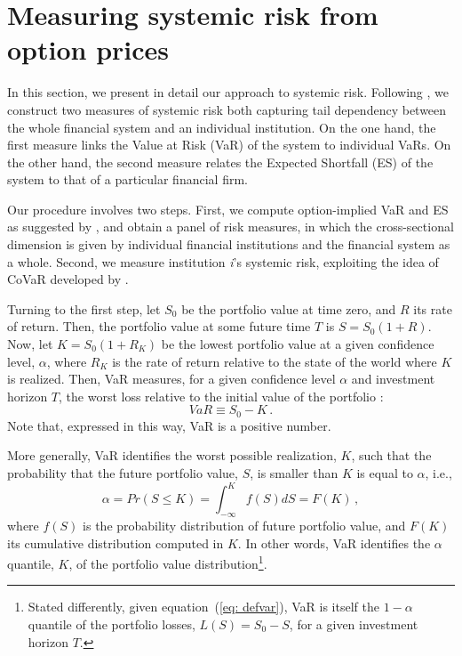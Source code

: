 \documentclass[11pt,a4paper,english]{article}
\begin{document}
\section{Measuring systemic risk from option prices}
\label{sec: model}
In this section, we present in detail our approach to systemic risk. Following \citet{Adrian2016}, we construct two measures of systemic risk both capturing tail dependency between the whole financial system and an individual institution. On the one hand, the first measure links the Value at Risk (VaR) of the system to individual VaRs. On the other hand, the second measure relates the Expected Shortfall (ES) of the system to that of a particular financial firm.

Our procedure involves two steps. First, we compute option-implied VaR and ES as suggested by \citet{GBA16}, and obtain a panel of risk measures, in which the cross-sectional dimension is given by individual financial institutions and the financial system as a whole. Second, we measure institution \textit{i}'s systemic risk, exploiting the idea of CoVaR developed by \citet{Adrian2016}.

Turning to the first step, let $S_0$ be the portfolio value at time zero, and $R$ its rate of return. Then, the portfolio value at some future time $T$ is $S=S_0(1+R)$. Now, let $K=S_0(1+R_K)$ be the lowest portfolio value at a given confidence level, $\alpha$, where $R_K$ is the rate of return relative to the state of the world where $K$ is realized. Then, VaR measures, for a given confidence level $\alpha$ and investment horizon $T$, the worst loss relative to the initial value of the portfolio \citep{Jorion2007}:
\begin{equation}
\label{eq: defvar}
VaR \equiv S_0 - K \, .
\end{equation}
Note that, expressed in this way, VaR is a positive number.

More generally, VaR identifies the worst possible realization, $K$, such that the probability that the future portfolio value, $S$, is smaller than $K$ is equal to $\alpha$, i.e.,
\begin{equation}
\label{eq: formalvar}
\alpha=Pr(S\leq K)=\int_{-\infty}^{K}f(S)dS=F(K) \, ,
\end{equation}
where $f(S)$ is the probability distribution of future portfolio value, and $F(K)$ its cumulative distribution computed in $K$. In other words, VaR identifies the $\alpha$ quantile, $K$, of the portfolio value distribution\footnote{Stated differently, given equation~(\ref{eq: defvar}), VaR is itself the $1-\alpha$ quantile of the portfolio losses, $L(S)=S_0-S$, for a given investment horizon $T$.}.
\end{document}
